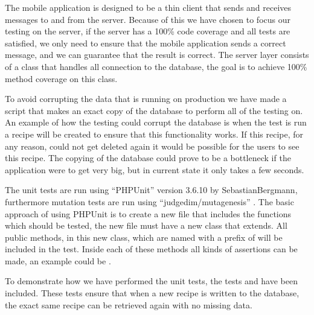 The mobile application is designed to be a thin client that sends and receives messages to and from the server. Because of this we have chosen to focus our testing on the server, if the server has a 100\% code coverage and all tests are satisfied, we only need to ensure that the mobile application sends a correct message, and we can guarantee that the result is correct.
The server layer consists of a class that handles all connection to the database, the goal is to achieve 100\% method coverage on this class.

To avoid corrupting the data that is running on production we have made a script that makes an exact copy of the database to perform all of the testing on. An example of how the testing could corrupt the database is when the test is run a recipe will be created to ensure that this functionality works. If this recipe, for any reason, could not get deleted again it would be possible for the users to see this recipe. The copying of the database could prove to be a bottleneck if the application were to get very big, but in current state it only takes a few seconds.

The unit tests are run using ``PHPUnit'' version 3.6.10 by Sebastian\linebreak Bergmann\cite{phpunit}, furthermore mutation tests are run using ``judgedim/mutagenesis'' \cite{mutagenesis}. The basic approach of using PHPUnit is to create a new file that includes the functions which should be tested, the new file must have a new class that extends\linebreak {}. All public methods, in this new class, which are named with a prefix of  will be included in the test. Inside each of these methods all kinds of assertions can be made, an example could be .

To demonstrate how we have performed the unit tests, the tests \linebreak{} and  have been included. These tests ensure that when a new recipe is written to the database, the exact same recipe can be retrieved again with no missing data.

